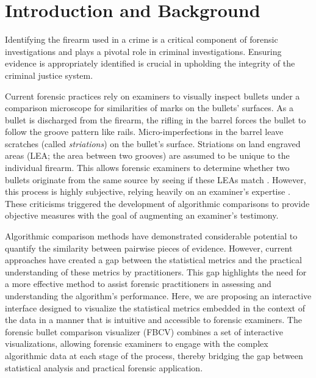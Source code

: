 \documentclass[
  number,
  preprint,
  5p,
  twocolumn]{elsarticle}
\begin{document}
\section{Introduction and Background}\label{introduction-and-background}

Identifying the firearm used in a crime is a critical component of
forensic investigations and plays a pivotal role in criminal
investigations. Ensuring evidence is appropriately identified is crucial
in upholding the integrity of the criminal justice system.

Current forensic practices rely on examiners to visually inspect bullets
under a comparison microscope for similarities of marks on the bullets'
surfaces. As a bullet is discharged from the firearm, the rifling in the
barrel forces the bullet to follow the groove pattern like rails.
Micro-imperfections in the barrel leave scratches (called
\emph{striations}) on the bullet's surface. Striations on land engraved
areas (LEA; the area between two grooves) are assumed to be unique to
the individual firearm. This allows forensic examiners to determine
whether two bullets originate from the same source by seeing if these
LEAs match \citep{afte}. However, this process is highly subjective,
relying heavily on an examiner's expertise \citep{nas2009, pcast}. These
criticisms triggered the development of algorithmic comparisons
\citep{carriquiryMachineLearningForensic2019, chenFiredBulletSignature2019, chuAutomaticIdentificationBullet2013, juOpenSourceImplementationCMPS2022, vorburgerApplicationsCrosscorrelationFunctions2011, vorburgerTopographyMeasurementsApplications2015}
to provide objective measures with the goal of augmenting an examiner's
testimony.

Algorithmic comparison methods have demonstrated considerable potential
to quantify the similarity between pairwise pieces of evidence. However,
current approaches have created a gap between the statistical metrics
and the practical understanding of these metrics by practitioners. This
gap highlights the need for a more effective method to assist forensic
practitioners in assessing and understanding the algorithm's
performance. Here, we are proposing an interactive interface designed to
visualize the statistical metrics embedded in the context of the data
\citep{wickhamVisualizingStatisticalModels2015} in a manner that is
intuitive and accessible to forensic examiners. The forensic bullet
comparison visualizer (FBCV) combines a set of interactive
visualizations, allowing forensic examiners to engage with the complex
algorithmic data at each stage of the process, thereby bridging the gap
between statistical analysis and practical forensic application.
\end{document}
